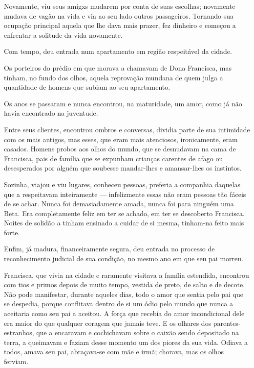 \documentclass[11pt,a4paper,twoside,openany]{book}
\begin{document}
Novamente, viu seus amigxs mudarem por conta de suas escolhas; novamente mudava de vagão na vida e via ao seu lado outros passageiros. Tornando sua ocupação principal aquela que lhe dava mais prazer, fez dinheiro e começou a enfrentar a solitude da vida novamente.

Com tempo, deu entrada num apartamento em região respeitável da cidade.

Os porteiros do prédio em que morava a chamavam de Dona Francisca, mas tinham, no fundo dos olhos, aquela reprovação mundana de quem julga a quantidade de homens que subiam ao seu apartamento.

Os anos se passaram e nunca encontrou, na maturidade, um amor, como já não havia encontrado na juventude.

Entre seus clientes, encontrou ombros e conversas, dividia parte de sua intimidade com os mais antigos, mas esses, que eram mais atenciosos, ironicamente, eram casados. Homens probos aos olhos do mundo, que se desnudavam na cama de Francisca, pais de família que se expunham crianças carentes de afago ou desesperados por alguém que soubesse mandar-lhes e amansar-lhes os instintos.

Sozinha, viajou e viu lugares, conheceu pessoas, preferia a companhia daquelas que a respeitavam inteiramente --- infelizmente essas não eram pessoas tão fáceis de se achar. Nunca foi demasiadamente amada, nunca foi para ninguém uma Beta. Era completamente feliz em ter se achado, em ter se descoberto Francisca. Noites de solidão a tinham ensinado a cuidar de si mesma, tinham-na feito mais forte.

Enfim, já madura, financeiramente segura, deu entrada no processo de reconhecimento judicial de sua condição, no mesmo ano em que seu pai morreu.

Francisca, que vivia na cidade e raramente visitava a família estendida, encontrou com tios e primos depois de muito tempo, vestida de preto, de salto e de decote. Não pode manifestar, durante aqueles dias, todo o amor que sentia pelo pai que se despedia, porque conflitava dentro de si um ódio pelo mundo que nunca a aceitaria como seu pai a aceitou. A força que recebia do amor incondicional dele era maior do que qualquer coragem que jamais teve. E os olhares dos parentes-estranhos, que a encaravam e cochichavam sobre o caixão sendo depositado na terra, a queimavam e faziam desse momento um dos piores da sua vida. Odiava a todos, amava seu pai, abraçava-se com mãe e irmã; chorava, mas os olhos ferviam.
\end{document}
